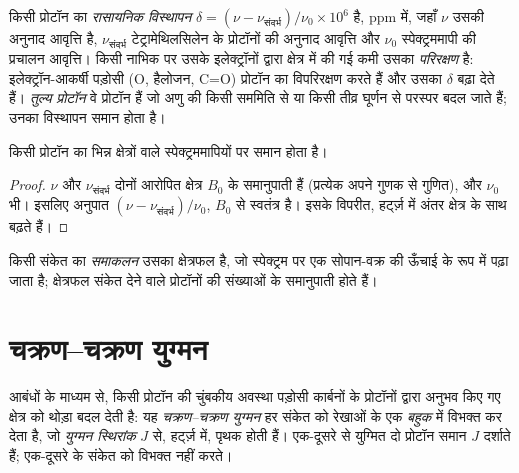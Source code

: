\begin{definition}[रासायनिक विस्थापन, परिरक्षण, तुल्य प्रोटॉन]\label{def:b1:structure-spectroscopy:chemical-shift}
किसी प्रोटॉन का \emph{रासायनिक विस्थापन}
$\delta = (\nu - \nu_{\text{संदर्भ}})/\nu_0 \times 10^6$ है, \unit{ppm} में, जहाँ
$\nu$ उसकी अनुनाद आवृत्ति है, $\nu_{\text{संदर्भ}}$ टेट्रामेथिलसिलेन के प्रोटॉनों की
अनुनाद आवृत्ति और $\nu_0$ स्पेक्ट्रममापी की
प्रचालन आवृत्ति। किसी नाभिक पर उसके इलेक्ट्रॉनों द्वारा क्षेत्र में की गई कमी
उसका \emph{परिरक्षण} है: इलेक्ट्रॉन-आकर्षी पड़ोसी
(O, हैलोजन, C=O) प्रोटॉन का विपरिरक्षण करते हैं और उसका $\delta$ बढ़ा देते हैं।
\emph{तुल्य प्रोटॉन} वे प्रोटॉन हैं जो अणु की किसी
सममिति से या किसी तीव्र घूर्णन से परस्पर बदल जाते हैं; उनका विस्थापन
समान होता है।
\end{definition}

\begin{proposition}\label{prop:b1:structure-spectroscopy:shift-field-independent}
किसी प्रोटॉन का  भिन्न क्षेत्रों वाले स्पेक्ट्रममापियों पर
समान होता है।
\end{proposition}

\begin{proof}
$\nu$ और $\nu_{\text{संदर्भ}}$ दोनों आरोपित क्षेत्र
$B_0$ के समानुपाती हैं (प्रत्येक अपने  गुणक से गुणित), और $\nu_0$ भी।
इसलिए अनुपात $(\nu - \nu_{\text{संदर्भ}})/\nu_0$, $B_0$ से
स्वतंत्र है। इसके विपरीत, हर्ट्ज़ में अंतर क्षेत्र के साथ बढ़ते हैं।
\end{proof}

\begin{definition}[समाकलन]\label{def:b1:structure-spectroscopy:integration}
किसी संकेत का \emph{समाकलन} उसका क्षेत्रफल है, जो
स्पेक्ट्रम पर एक सोपान-वक्र की ऊँचाई के रूप में पढ़ा जाता है; क्षेत्रफल
संकेत देने वाले प्रोटॉनों की संख्याओं के समानुपाती होते हैं।
\end{definition}

\section{चक्रण--चक्रण युग्मन}

\begin{definition}[चक्रण--चक्रण युग्मन, युग्मन स्थिरांक, बहुक]\label{def:b1:structure-spectroscopy:coupling}
आबंधों के माध्यम से, किसी प्रोटॉन की चुंबकीय अवस्था पड़ोसी कार्बनों के प्रोटॉनों
द्वारा अनुभव किए गए क्षेत्र को थोड़ा बदल देती है: यह
\emph{चक्रण--चक्रण युग्मन} हर संकेत को
रेखाओं के एक \emph{बहुक} में विभक्त कर देता है, जो
\emph{युग्मन स्थिरांक} $J$ से, हर्ट्ज़ में, पृथक होती हैं। एक-दूसरे से
युग्मित दो प्रोटॉन समान $J$ दर्शाते हैं;  एक-दूसरे के संकेत को
विभक्त नहीं करते।
\end{definition}

